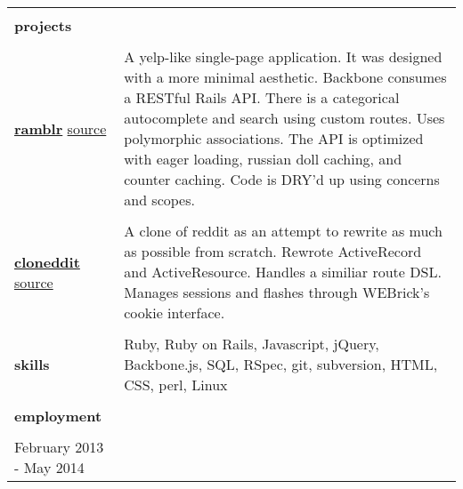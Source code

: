 \documentclass{article}
\begin{document}
\begin{tabular}{L{2.5cm} R{14cm}}
    
    \hline \\

    \large{\textbf{projects}} \\\\
    \normalsize
    
    \href{http://www.ramblr.co}{\large{\textbf{ramblr}}}
    \normalsize
    \newline
    \href{https://github.com/kellyjospehprice/ramblr}{source}
    
    &
    
    A yelp-like single-page application. It was designed with a more
    minimal aesthetic. Backbone consumes a RESTful Rails API. There is a categorical
    autocomplete and search using custom routes. Uses polymorphic associations. 
    The API is optimized with eager loading, russian doll caching, and counter
    caching. Code is DRY'd up using concerns and scopes.

    \\\\
    
    \href{http://klog.io/cloneddit}{\large{\textbf{cloneddit}}}
    \normalsize
    \newline
    \href{https://github.com/kellyjospehprice/cloneddit}{source}
    
    &
    
    A clone of reddit as an attempt to rewrite as much as possible from
    scratch. Rewrote ActiveRecord and ActiveResource. Handles a similiar route
    DSL. Manages sessions and flashes through WEBrick's cookie interface.

    \\ \hline \\

    \large{\textbf{skills}}
    \normalsize

    &

    Ruby, Ruby on Rails, Javascript, jQuery, Backbone.js, SQL, RSpec, git, 
    subversion, HTML, CSS, perl, Linux

    \\ \hline \\

    \large{\textbf{employment}} \\\\
    \normalsize

    February 2013 - May 2014
    

\end{tabular}
\end{document}
